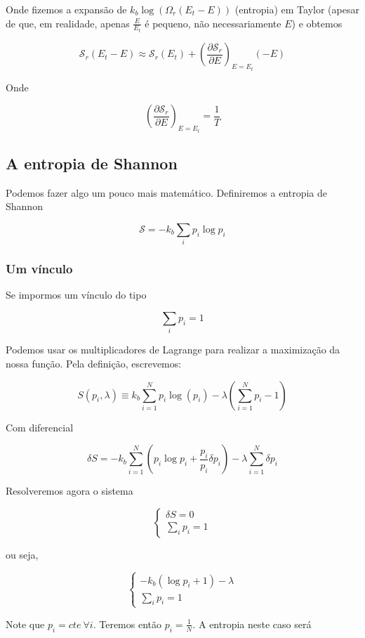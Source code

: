 Onde fizemos a expansão de $k_b \log{(\Omega_r(E_t - E))}$ (entropia) em Taylor (apesar de que, em realidade, apenas $\frac{E}{E_t}$ é pequeno, não necessariamente $E$) e obtemos

\[
	\mathcal{S}_r(E_t - E) \approx \mathcal{S}_r(E_t) + \left( \frac{\partial \mathcal{S}_r}{\partial E}\right)_{E=E_t} (-E)
\]

Onde 

\[
	\left( \frac{\partial \mathcal{S}_r}{\partial E} \right)_{E=E_t} = \frac{1}{T}
\]

\subsection{A entropia de Shannon}

Podemos fazer algo um pouco mais matemático. Definiremos a entropia de Shannon

\[
	\mathcal{S} = -k_b \sum_{i} p_i \log{p_i}
\]

\subsubsection{Um vínculo}

Se impormos um vínculo do tipo

\[
	\sum_{i} p_i = 1
\]

Podemos usar os multiplicadores de Lagrange para realizar a maximização da nossa função. Pela definição, escrevemos:

\[
	S({p_i}, \lambda) \equiv k_b \sum_{i=1}^{N} p_i \log{(p_i)} - \lambda \left( \sum_{i=1}^{N}p_i -1 \right) 
\]

Com diferencial

\[
	\delta S = - k_b \sum_{i=1}^{N} \left( p_i \log{p_i} + \frac{p_i}{p_i} \delta p_i \right) - \lambda \sum_{i=1}^{N}\delta p_i
\]

Resolveremos agora o sistema

\[
 \begin{cases}
	\delta S = 0 \\
	\sum_{i} p_i = 1
\end{cases}
\]

ou seja,

\[
\begin{cases}
	-k_b (\log{p_i} + 1) - \lambda \\
	\sum_{i} p_i = 1
\end{cases}
\]

Note que $p_i = cte \ \forall i$. Teremos então $p_i = \frac{1}{N}$. A entropia neste caso será 

